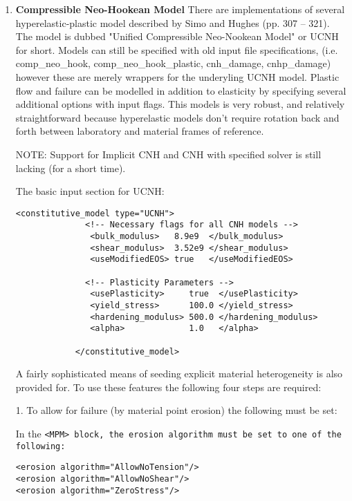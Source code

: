 \begin{enumerate}
\item{\bf Compressible Neo-Hookean Model} There are implementations of several
hyperelastic-plastic model described by Simo and Hughes\cite{simo1998} (pp. 307 -- 321). 
 The model is dubbed "Unified Compressible Neo-Nookean Model" or UCNH for short.  Models can 
still be specified with old input file specifications, (i.e. comp\_neo\_hook, comp\_neo\_hook\_plastic,
cnh\_damage, cnhp\_damage) however these are merely wrappers for the underyling UCNH model.
 Plastic flow and failure can be modelled in addition to elasticity by  specifying 
several additional options with input flags. This models is very robust, and relatively 
straightforward because hyperelastic models don't require rotation back and forth 
between laboratory and material frames of reference.

NOTE: Support for Implicit CNH and CNH with specified solver is still lacking (for a short time).

The basic input section for UCNH:

\begin{Verbatim}[fontsize=\footnotesize]
            <constitutive_model type="UCNH"> 
              <!-- Necessary flags for all CNH models -->
               <bulk_modulus>   8.9e9  </bulk_modulus>
               <shear_modulus>  3.52e9 </shear_modulus>
               <useModifiedEOS> true   </useModifiedEOS>
                
              <!-- Plasticity Parameters -->
               <usePlasticity>     true  </usePlasticity>
               <yield_stress>      100.0 </yield_stress>
               <hardening_modulus> 500.0 </hardening_modulus>
               <alpha>             1.0   </alpha>

            </constitutive_model>
\end{Verbatim}

A fairly sophisticated means of seeding explicit material heterogeneity is also provided for. 
To use these features the following four steps are required: 

1. To allow for failure (by material point erosion) the following must be set: 

In the \tt <MPM> \normalfont block, the erosion algorithm must be set to one of the following: 

\begin{Verbatim}[fontsize=\footnotesize]
<erosion algorithm="AllowNoTension"/>
<erosion algorithm="AllowNoShear"/>
<erosion algorithm="ZeroStress"/>
\end{Verbatim}


\end{enumerate}

